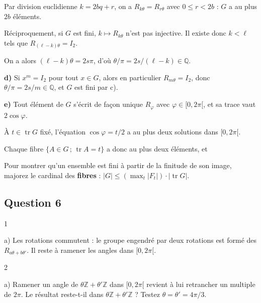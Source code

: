 \documentclass[11pt,a4paper]{article}
\newcommand{\equationajustee}[1]{%
  \sbox{\boiteequation}{$\displaystyle #1$}%
  \ifdim\wd\boiteequation>\linewidth
    \[\resizebox{\linewidth}{!}{\usebox{\boiteequation}}\]%
  \else
    \[#1\]%
  \fi}
\begin{document}
Par division euclidienne \(k=2bq+r\), on a \(R_{k\theta}=R_{r\theta}\) avec \(0\leqslant r<2b\) : \(G\) a au plus \(2b\) éléments.

Réciproquement, si \(G\) est fini, \(k\mapsto R_{k\theta}\) n'est pas injective. Il existe donc \(k<\ell\) tels que \(R_{(\ell-k)\theta}=I_2\).

On a alors \((\ell-k)\theta=2s\pi\), d'où \(\theta/\pi=2s/(\ell-k)\in\mathbb{Q}\).

\equationajustee{\boxed{G\ \text{fini}\iff\theta/\pi\in\mathbb{Q}.}}

\textbf{d)} Si \(x^m=I_2\) pour tout \(x\in G\), alors en particulier \(R_{m\theta}=I_2\), donc \(\theta/\pi=2s/m\in\mathbb{Q}\), et \(G\) est fini par c).

\textbf{e)} Tout élément de \(G\) s'écrit de façon unique \(R_\varphi\) avec \(\varphi\in[0,2\pi[\), et sa trace vaut \(2\cos\varphi\).

À \(t\in\operatorname{tr}G\) fixé, l'équation \(\cos\varphi=t/2\) a au plus deux solutions dans \([0,2\pi[\).

Chaque fibre \(\{A\in G\,;\,\operatorname{tr}A=t\}\) a donc au plus deux éléments, et

\equationajustee{|G|\leqslant2|\operatorname{tr}G|<+\infty.}

\begin{methode}

Pour montrer qu'un ensemble est fini à partir de la finitude de son image, majorez le cardinal des \textbf{fibres} : \(|G|\leqslant(\max_t|F_t|)\cdot|\operatorname{tr}G|\).

\end{methode}

\hypertarget{question-6}{%
\subsection{Question 6}\label{question-6}}

\begin{indication}{1}

a) Les rotations commutent : le groupe engendré par deux rotations est formé des \(R_{a\theta+b\theta'}\). Il reste à ramener les angles dans \([0,2\pi[\).

\end{indication}

\begin{indication}{2}

a) Ramener un angle de \(\theta\mathbb{Z}+\theta'\mathbb{Z}\) dans \([0,2\pi[\) revient à lui retrancher un multiple de \(2\pi\). Le résultat reste-t-il dans \(\theta\mathbb{Z}+\theta'\mathbb{Z}\) ? Testez \(\theta=\theta'=4\pi/3\).

\end{indication}
\end{document}
